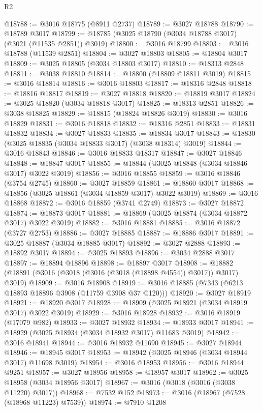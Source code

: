 \begin{lexlean}{R2}
\begin{coremodule}
@18788 := @3016 @18775 (@8911 @2737)
@18789 := @3027 @18788
@18790 := @18789 @3017
@18799 := @18785 (@3025 @18790 (@3034 @18788 @3017) (@3021 (@11535 @2851)) @3019)
@18800 := @3016 @18799
@18803 := @3016 @18788 (@11539 @2851)
@18804 := @3027 @18803
@18805 := @18804 @3017
@18809 := @3025 @18805 (@3034 @18803 @3017)
@18810 := @18313 @2848
@18811 := @3038 @18810
@18814 := @18800 (@18809 @18811 @3019)
@18815 := @3016 @18814
@18816 := @3016 @18803
@18817 := @18316 @2848
@18818 := @18816 @18817
@18819 := @3027 @18818
@18820 := @18819 @3017
@18824 := @3025 @18820 (@3034 @18818 @3017)
@18825 := @18313 @2851
@18826 := @3038 @18825
@18829 := @18815 (@18824 @18826 @3019)
@18830 := @3016 @18829
@18831 := @3016 @18818
@18832 := @18316 @2851
@18833 := @18831 @18832
@18834 := @3027 @18833
@18835 := @18834 @3017
@18843 := @18830 (@3025 @18835 (@3034 @18833 @3017) (@3038 @18314) @3019)
@18844 := @3016 @18843
@18846 := @3016 @18833 @18317
@18847 := @3027 @18846
@18848 := @18847 @3017
@18855 := @18844 (@3025 @18848 (@3034 @18846 @3017) @3022 @3019)
@18856 := @3016 @18855
@18859 := @3016 @18846 (@3754 @2745)
@18860 := @3027 @18859
@18861 := @18860 @3017
@18868 := @18856 (@3025 @18861 (@3034 @18859 @3017) @3022 @3019)
@18869 := @3016 @18868
@18872 := @3016 @18859 (@3741 @2749)
@18873 := @3027 @18872
@18874 := @18873 @3017
@18881 := @18869 (@3025 @18874 (@3034 @18872 @3017) @3022 @3019)
@18882 := @3016 @18881
@18885 := @3016 @18872 (@3727 @2753)
@18886 := @3027 @18885
@18887 := @18886 @3017
@18891 := @3025 @18887 (@3034 @18885 @3017)
@18892 := @3027 @2888
@18893 := @18892 @3017
@18894 := @3025 @18893
@18896 := @3034 @2888 @3017
@18897 := @18894 @18896
@18898 := @18897 @3017
@18908 := @18882 (@18891 (@3016 (@3018 (@3016 (@3018 (@18898 @4554)) @3017)) @3017) @3019)
@18909 := @3016 @18908
@18919 := @3016 @18885 (@7343 (@6213 @18893 @18896 @3908 (@11759 @3908 @37 @120)))
@18920 := @3027 @18919
@18921 := @18920 @3017
@18928 := @18909 (@3025 @18921 (@3034 @18919 @3017) @3022 @3019)
@18929 := @3016 @18928
@18932 := @3016 @18919 (@17079 @982)
@18933 := @3027 @18932
@18934 := @18933 @3017
@18941 := @18929 (@3025 @18934 (@3034 @18932 @3017) @11683 @3019)
@18942 := @3016 @18941
@18944 := @3016 @18932 @11690
@18945 := @3027 @18944
@18946 := @18945 @3017
@18953 := @18942 (@3025 @18946 (@3034 @18944 @3017) @11698 @3019)
@18954 := @3016 @18953
@18956 := @3016 @18944 @9251
@18957 := @3027 @18956
@18958 := @18957 @3017
@18962 := @3025 @18958 (@3034 @18956 @3017)
@18967 := @3016 (@3018 (@3016 (@3038 @11220) @3017))
@18968 := @7532 @152
@18973 := @3016 (@18967 (@7528 (@18968 @11223) @7539))
@18974 := @7910 @1208

\end{coremodule}
\end{lexlean}
